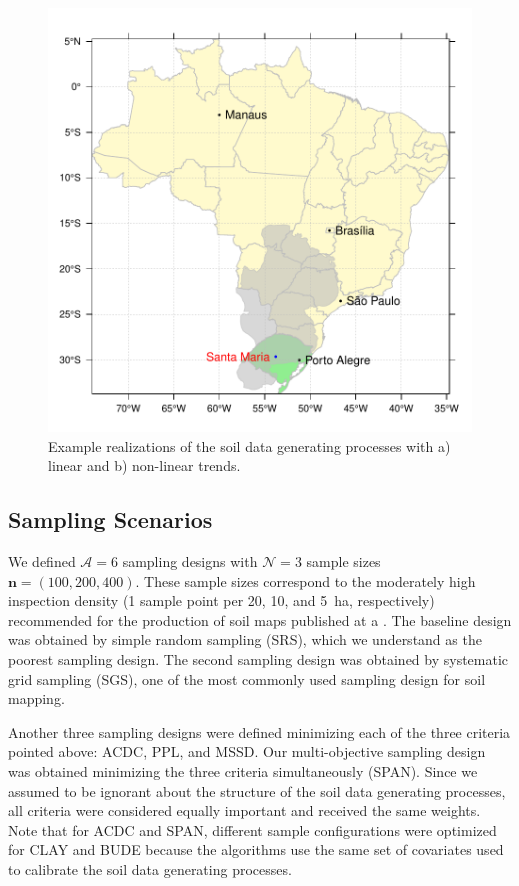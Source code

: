 \begin{figure}[!ht]
 \centering
 \includegraphics[draft = true, width = \textwidth]{fig/chap02-location}
 \caption{Example realizations of the soil data generating processes with a) linear and b) non-linear trends.}
 \label{fig:chap08-realizations}
\end{figure}

\subsection{Sampling Scenarios}

We defined $\mathcal{A} = 6$ sampling designs with $\mathcal{N} = 3$ sample sizes $\boldsymbol{n} = (100, 200, 
400)$. These sample sizes correspond to the moderately high inspection density (1 sample point per 20, 10, and 
\SI{5}{\hectare}, respectively) recommended for the production of soil maps published at a  
\cite{Rossiter2000}. The baseline design was obtained by simple random sampling (SRS), which we understand 
as the poorest sampling design. The second sampling design was obtained by systematic grid sampling (SGS), one 
of the most commonly used sampling design for soil mapping.

Another three sampling designs were defined minimizing each of the three criteria pointed above: ACDC, PPL, 
and MSSD. Our multi-objective sampling design was obtained minimizing the three criteria simultaneously 
(SPAN). Since we assumed to be ignorant about the structure of the soil data generating processes, all criteria 
were considered equally important and received the same weights. Note that for ACDC and SPAN, different sample 
configurations were optimized for CLAY and BUDE because the algorithms use the same set of covariates used to 
calibrate the soil data generating processes.

